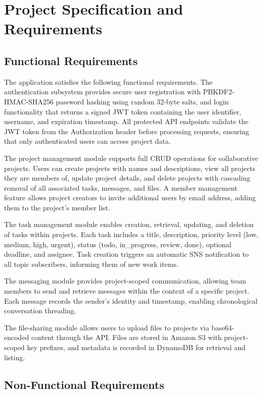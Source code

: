 \documentclass[conference]{IEEEtran}
\begin{document}
\section{Project Specification and Requirements}

\subsection{Functional Requirements}

The application satisfies the following functional requirements. The authentication subsystem provides secure user registration with PBKDF2-HMAC-SHA256 password hashing using random 32-byte salts, and login functionality that returns a signed JWT token containing the user identifier, username, and expiration timestamp. All protected API endpoints validate the JWT token from the Authorization header before processing requests, ensuring that only authenticated users can access project data.

The project management module supports full CRUD operations for collaborative projects. Users can create projects with names and descriptions, view all projects they are members of, update project details, and delete projects with cascading removal of all associated tasks, messages, and files. A member management feature allows project creators to invite additional users by email address, adding them to the project's member list.

The task management module enables creation, retrieval, updating, and deletion of tasks within projects. Each task includes a title, description, priority level (low, medium, high, urgent), status (todo, in\_progress, review, done), optional deadline, and assignee. Task creation triggers an automatic SNS notification to all topic subscribers, informing them of new work items.

The messaging module provides project-scoped communication, allowing team members to send and retrieve messages within the context of a specific project. Each message records the sender's identity and timestamp, enabling chronological conversation threading.

The file-sharing module allows users to upload files to projects via base64-encoded content through the API. Files are stored in Amazon S3 with project-scoped key prefixes, and metadata is recorded in DynamoDB for retrieval and listing.

\subsection{Non-Functional Requirements}
\end{document}
